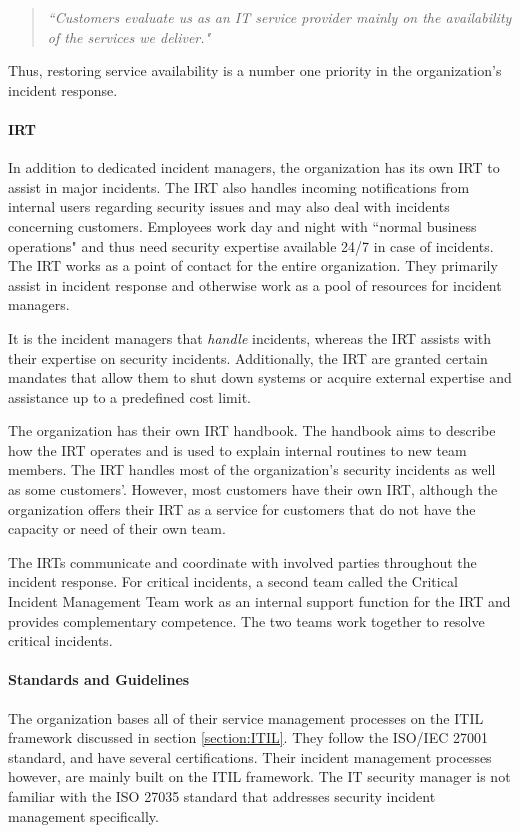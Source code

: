 \begin{quote}
\textit{``Customers evaluate us as an IT service provider mainly on the availability of the services we deliver."}
\end{quote}
Thus, restoring service availability is a number one priority in the organization's incident response.

\paragraph{\acl{IRT}}
In addition to dedicated incident managers, the organization has its own \ac{IRT} to assist in major incidents. The \ac{IRT} also handles incoming notifications from internal users regarding security issues and may also deal with incidents concerning customers. Employees work day and night with ``normal business operations" and thus need security expertise available 24/7 in case of incidents. The \ac{IRT} works as a point of contact for the entire organization. They primarily assist in incident response and otherwise work as a pool of resources for incident managers. 

It is the incident managers that \emph{handle} incidents, whereas the \ac{IRT} assists with their expertise on security incidents. Additionally, the \ac{IRT} are granted certain mandates that allow them to shut down systems or acquire external expertise and assistance up to a predefined cost limit.    

The organization has their own \ac{IRT} handbook. The handbook aims to describe how the \ac{IRT} operates and is used to explain internal routines to new team members. The \ac{IRT} handles most of the organization's security incidents as well as some customers'. However, most customers have their own \ac{IRT}, although the organization offers their \ac{IRT} as a service for customers that do not have the capacity or need of their own team.

The \acp{IRT} communicate and coordinate with involved parties throughout the incident response. For critical incidents, a second team called the Critical Incident Management Team work as an internal support function for the \ac{IRT} and provides complementary competence. The two teams work together to resolve critical incidents. 

\paragraph{Standards and Guidelines}
The organization bases all of their service management processes on the ITIL framework discussed in section \ref{section:ITIL}. They follow the ISO/IEC 27001 standard, and have several certifications. Their incident management processes however, are mainly built on the ITIL framework. The IT security manager is not familiar with the ISO 27035 standard that addresses security incident management specifically. 

